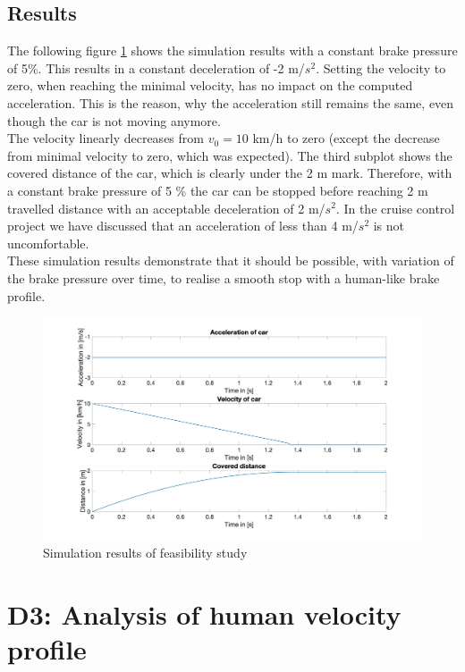 \section{Results}\label{sec:D2_results}
The following figure \ref{fig:D2_Result} shows the simulation results with a constant brake pressure of 5\%. This results in a constant deceleration of -2 m/$s^2$. Setting the velocity to zero, when reaching the minimal velocity, has no impact on the computed acceleration. This is the reason, why the acceleration still remains the same, even though the car is not moving anymore.\\
The velocity linearly decreases from $v_0 = 10$ km/h to zero (except the decrease from minimal velocity to zero, which was expected).
The third subplot shows the covered distance of the car, which is clearly under the 2 m mark.
Therefore, with a constant brake pressure of 5 \% the car can be stopped before reaching 2 m travelled distance with an acceptable deceleration of 2 m/$s^2$. In the cruise control project we have discussed that an acceleration of less than 4 m/$s^2$ is not uncomfortable.\\
These simulation results demonstrate that it should be possible, with variation of the brake pressure over time, to realise a smooth stop with a human-like brake profile.

\begin{figure}[H]
\centering
\includegraphics[width=1\textwidth]{images/D2_plot.jpg}
\caption{Simulation results of feasibility study}
\label{fig:D2_Result}
\end{figure}

\chapter{D3: Analysis of human velocity profile}\label{cha:D3}

